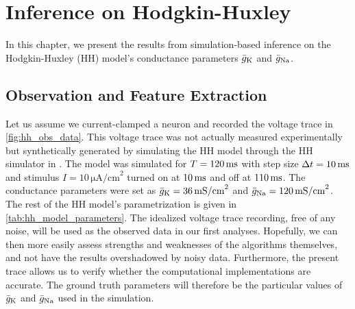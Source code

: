\chapter{Inference on Hodgkin-Huxley}\label{chap:res_hh}

In this chapter, we present the results from simulation-based inference on the Hodgkin-Huxley (HH) model's conductance parameters $\bar{g}_{\mathrm{K}}$ and $\bar{g}_{\mathrm{Na}}$. 







\section{Observation and Feature Extraction}

Let us assume we current-clamped a neuron and recorded the voltage trace in \autoref{fig:hh_obs_data}. This voltage trace was not actually measured experimentally but synthetically generated by simulating the HH model through the HH simulator in . The model was simulated for $T=120\,\mathrm{ms}$ with step size $\Delta t =10 \,\mathrm{ms}$ and stimulus $I = 10 \, \mathrm{\mu A/cm}^2$ turned on at $10 \,\mathrm{ms}$ and off at $110 \,\mathrm{ms}$. The conductance parameters were set as $\bar{g}_{\mathrm{K}}=36 \,\mathrm{mS/cm}^2$ and $\bar{g}_{\mathrm{Na}}=120 \,\mathrm{mS/cm}^2$. The rest of the HH model's parametrization is given in \autoref{tab:hh_model_parameters}. The idealized voltage trace recording, free of any noise, will be used as the observed data in our first analyses. Hopefully, we can then more easily assess strengths and weaknesses of the algorithms themselves, and not have the results overshadowed by noisy data. Furthermore, the present trace allows us to verify whether the computational implementations are accurate. The ground truth parameters will therefore be the particular values of $\bar{g}_{\mathrm{K}}$ and $\bar{g}_{\mathrm{Na}}$ used in the simulation.  

